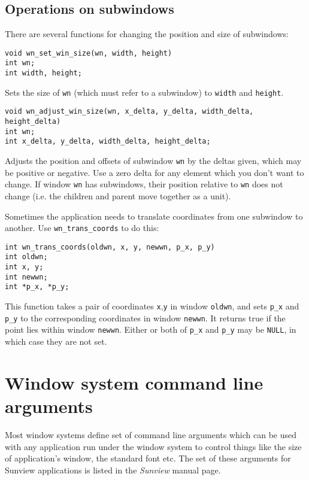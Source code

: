 \subsection{Operations on subwindows}
There are several functions for changing the position and size of
subwindows:
\begin{verbatim}
void wn_set_win_size(wn, width, height)
int wn;
int width, height;
\end{verbatim}
Sets the size of {\tt wn} (which must refer to a subwindow) to {\tt width}
and {\tt height}.
\begin{verbatim}
void wn_adjust_win_size(wn, x_delta, y_delta, width_delta, height_delta)
int wn;
int x_delta, y_delta, width_delta, height_delta;
\end{verbatim}
Adjusts the position and offsets of subwindow {\tt wn} by the deltas
given, which may be positive or negative.  Use a zero delta for any
element which you don't want to change.
If window {\tt wn} has subwindows, their position relative to {\tt wn}
does not change (i.e. the children and parent move together as a unit).

Sometimes the application needs to translate coordinates from one
subwindow to another.
Use {\tt wn\_trans\_coords} to do this:
\begin{verbatim}
int wn_trans_coords(oldwn, x, y, newwn, p_x, p_y)
int oldwn;
int x, y;
int newwn;
int *p_x, *p_y;
\end{verbatim}
This function takes a pair of coordinates {\tt x},{\tt y} in window {\tt oldwn},
and sets {\tt *p\_x} and {\tt *p\_y} to the corresponding coordinates
in window {\tt newwn}.  It returns true if the point lies within window
{\tt newwn}.  Either or both of {\tt *p\_x} and {\tt *p\_y} may be {\tt NULL},
in which case they are not set.
\section{Window system command line arguments}
\label{munge_args}
Most window systems define set of command line arguments which can
be used with any application run under the window system to control
things like the size of application's window, the standard font etc.
The set of these arguments for Sunview applications is listed
in the {\em Sunview} manual page.

